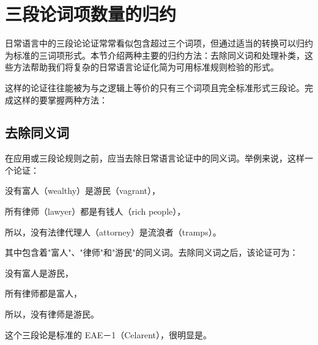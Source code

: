 \section{三段论词项数量的归约}

\begin{logicbox}[title=引言]
日常语言中的三段论论证常常看似包含超过三个词项，但通过适当的转换可以归约为标准的三词项形式。本节介绍两种主要的归约方法：去除同义词和处理补类，这些方法帮助我们将复杂的日常语言论证化简为可用标准规则检验的形式。
\end{logicbox}

这样的论证往往能被为与之逻辑上等价的只有三个词项且完全标准形式三段论。完成这样的要掌握两种方法：

\subsection{去除同义词}
\begin{examplebox}[title=去除同义词的方法]
在应用或三段论规则之前，应当去除日常语言论证中的同义词。举例来说，这样一个论证：

没有富人（wealthy）是游民（vagrant），

所有律师（lawyer）都是有钱人（rich people），

所以，没有法律代理人（attorney）是流浪者（tramps）。

其中包含着"富人"、"律师"和"游民"的同义词。去除同义词之后，该论证可为：

没有富人是游民，

所有律师都是富人，

所以，没有律师是游民。

这个三段论是标准的 EAE－1（Celarent），很明显是。
\end{examplebox}

